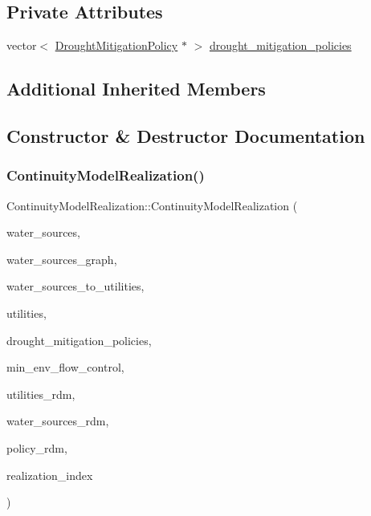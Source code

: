 \subsection*{Private Attributes}
\begin{DoxyCompactItemize}
\item 
vector$<$ \mbox{\hyperlink{classDroughtMitigationPolicy}{Drought\+Mitigation\+Policy}} $\ast$ $>$ \mbox{\hyperlink{classContinuityModelRealization_a757dcf1de115c674fd5adcb040c5f277_a757dcf1de115c674fd5adcb040c5f277}{drought\+\_\+mitigation\+\_\+policies}}
\end{DoxyCompactItemize}
\subsection*{Additional Inherited Members}


\subsection{Constructor \& Destructor Documentation}
\mbox{\label{classContinuityModelRealization_a641c096ac73586597b3e21a5d516c923_a641c096ac73586597b3e21a5d516c923}} 
\subsubsection{\texorpdfstring{Continuity\+Model\+Realization()}{ContinuityModelRealization()}}
{\footnotesize\ttfamily Continuity\+Model\+Realization\+::\+Continuity\+Model\+Realization (\begin{DoxyParamCaption}\item[{vector$<$ \mbox{\hyperlink{classWaterSource}{Water\+Source}} $\ast$$>$ \&}]{water\+\_\+sources,  }\item[{const \mbox{\hyperlink{classGraph}{Graph}} \&}]{water\+\_\+sources\+\_\+graph,  }\item[{const vector$<$ vector$<$ int $>$$>$ \&}]{water\+\_\+sources\+\_\+to\+\_\+utilities,  }\item[{vector$<$ \mbox{\hyperlink{classUtility}{Utility}} $\ast$$>$ \&}]{utilities,  }\item[{const vector$<$ \mbox{\hyperlink{classDroughtMitigationPolicy}{Drought\+Mitigation\+Policy}} $\ast$$>$ \&}]{drought\+\_\+mitigation\+\_\+policies,  }\item[{vector$<$ \mbox{\hyperlink{classMinEnvFlowControl}{Min\+Env\+Flow\+Control}} $\ast$$>$ \&}]{min\+\_\+env\+\_\+flow\+\_\+control,  }\item[{vector$<$ double $>$ \&}]{utilities\+\_\+rdm,  }\item[{vector$<$ double $>$ \&}]{water\+\_\+sources\+\_\+rdm,  }\item[{vector$<$ double $>$ \&}]{policy\+\_\+rdm,  }\item[{const unsigned int}]{realization\+\_\+index }\end{DoxyParamCaption})}

